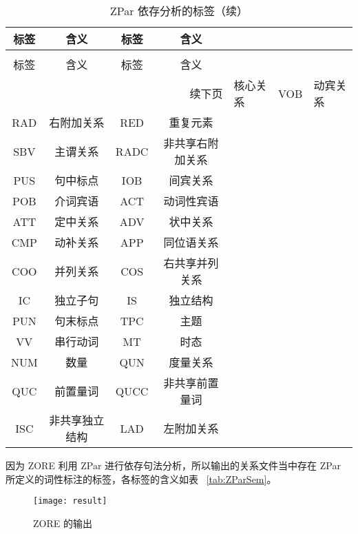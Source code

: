 \begin{longtable}{|c|c|c|c|}
\caption[ZPar 依存分析标签]{ZPar 依存分析的标签} \label{tab:ZParDep} \\
\toprule[1.5pt]
 标签 & 含义 & 标签 & 含义 \\
\midrule[1pt]
\endfirsthead
\caption[]{ZPar 依存分析的标签（续）} \\
\toprule[1.5pt]
 标签 & 含义 & 标签 & 含义 \\
\midrule[1pt]
\endhead
\hline
\multicolumn{4}{r}{\small 续下页}
\endfoot
\bottomrule[1.5pt]
\endlastfoot
    ROOT    &   核心关系    &  VOB     &   动宾关系    \\
    \hline
    RAD     &   右附加关系    & RED    &   重复元素    \\
    \hline
    SBV     &   主谓关系     & RADC    &   非共享右附加关系    \\
    \hline
    PUS     &   句中标点      & IOB    &   间宾关系    \\
    \hline
    POB    &   介词宾语      & ACT    &   动词性宾语    \\
    \hline
    ATT    &   定中关系     & ADV    &   状中关系    \\
    \hline
    CMP    &   动补关系      & APP    &   同位语关系    \\
    \hline
    COO    &   并列关系      & COS    &   右共享并列关系    \\
    \hline
    IC    &   独立子句     & IS    &   独立结构    \\
    \hline
    PUN    &   句末标点      &  TPC    &   主题    \\
    \hline
    VV    &   串行动词      & MT    &   时态    \\
    \hline
    NUM    &   数量      & QUN    &   度量关系    \\
    \hline
    QUC    &   前置量词     & QUCC    &   非共享前置量词    \\
    \hline
     ISC    &   非共享独立结构      & LAD    &   左附加关系    \\
\end{longtable}

因为 ZORE 利用 ZPar 进行依存句法分析，所以输出的关系文件当中存在 ZPar 所定义的词性标注的标签，各标签的含义如表 ~\ref{tab:ZParSem}。

\begin{figure}[htb]
\centering
\texttt{[image: result]}
\caption{ZORE 的输出}\label{fig:result}
\end{figure}


